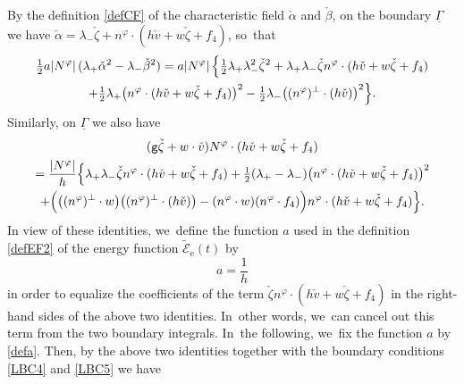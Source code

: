 \documentclass[10pt]{amsart}
\newcommand{\gr}{{\mathtt g}}
\newcommand{\ul}[1]{\underline{#1}}
\newcommand{\itGamma}{\mathit{\Gamma}}
\theoremstyle{definition}
\begin{document}
By the definition \eqref{defCF} of the characteristic field $\check{\alpha}$ and $\check{\beta}$, on the boundary $\ul{\itGamma}$ we have
$\check{\alpha}=\lambda_-\check{\zeta}+n^\varphi\cdot(h\check{v}+w\check{\zeta}+f_4)$, so~that
\begin{multline*}
\tfrac12a|N^\varphi|\,(\lambda_+\check{\alpha}^2-\lambda_-\check{\beta}^2)
= a|N^\varphi|\,\Bigl\{ \tfrac12\lambda_+\lambda_-^2\check{\zeta}^2 + \lambda_+\lambda_-\check{\zeta}n^\varphi\cdot(h\check{v}+w\check{\zeta}+f_4) \\
+ \tfrac12\lambda_+ \bigl(n^\varphi\cdot(h\check{v}+w\check{\zeta}+f_4) \bigr)^2 - \tfrac12\lambda_-\bigl((n^\varphi)^\perp\cdot(h\check{v}) \bigr)^2 \Bigr\}.
\end{multline*}
Similarly, on $\ul{\itGamma}$ we also have\enlargethispage{-2\baselineskip}
\begin{multline*}
(\gr\check{\zeta}+w\cdot\check{v})N^\varphi\cdot(h\check{v}+w\check{\zeta}+f_4) \\
= \dfrac{|N^\varphi|}{h}\Bigl\{ \lambda_+\lambda_-\check{\zeta}n^\varphi\cdot(h\check{v}+w\check{\zeta}+f_4)
+ \tfrac12(\lambda_+-\lambda_-) \bigl(n^\varphi\cdot(h\check{v}+w\check{\zeta}+f_4) \bigr)^2 \\
+ \Bigl(\bigl((n^\varphi)^\perp\cdot w \bigr) \bigl((n^\varphi)^\perp\cdot(h\check{v}) \bigr)-(n^\varphi\cdot w)(n^\varphi\cdot f_4) \Bigr)
n^\varphi\cdot(h\check{v}+w\check{\zeta}+f_4) \Bigr\}.
\end{multline*}
In view of these identities, we~define the function $a$ used in the definition \eqref{defEF2} of the energy function $\widetilde{\mathscr{E}}_\mathrm{e}(t)$ by
\begin{equation}\label{defa}
a=\frac{1}{h}
\end{equation}
in order to equalize the coefficients of the term $\check{\zeta}n^\varphi\cdot(h\check{v}+w\check{\zeta}+f_4)$ in the right-hand sides of the above two identities. In~other words, we~can cancel out this term from the two boundary integrals. In~the following, we~fix the function $a$ by \eqref{defa}.
Then, by the above two identities together with the boundary conditions \eqref{LBC4} and \eqref{LBC5} we have
\end{document}
